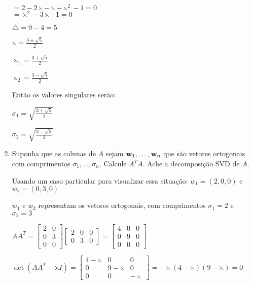 \documentclass[leqno]{article}
\numberwithin{equation}{section}
\begin{document}
\begin{enumerate}
\begin{sol}
		$= 2 - 2\leftthreetimes - \leftthreetimes + \leftthreetimes^2 - 1 = 0$\\
		$= \leftthreetimes^2 - 3\leftthreetimes + 1 = 0$
		
		$\bigtriangleup = 9 - 4 = 5$
		
		$\leftthreetimes = \frac{3 \pm \sqrt{5}}{2}$
		
		$\leftthreetimes_1 = \frac{3 + \sqrt{5}}{2}$
		
		$\leftthreetimes_2 = \frac{3 - \sqrt{5}}{2}$
		
		Então os valores singulares serão:
		
		$\sigma_1 = \sqrt{\frac{3 + \sqrt{5}}{2}}$
		
		$\sigma_2 = \sqrt{\frac{3 - \sqrt{5}}{2}}$
		\end{sol} 
		
		
		\item Suponha que as colunas de $A$ sejam $\mathbf{w}_1, \ldots, \mathbf{w}_n$ que são vetores ortogonais com comprimentos $\sigma_1, \ldots, \sigma_n$. Calcule $A^TA$. Ache a decomposição SVD de $A$.
		
		\begin{sol} 
			 Usando um caso particular para visualizar essa situação:
			 $w_1 = (2, 0, 0)$ e $w_2 = (0, 3, 0)$
			 
			 $w_1$ e $w_2$ representam os vetores ortogonais, com comprimentos $\sigma_1 = 2$ e $\sigma_2 = 3$
			 
			 $AA^T = \begin{bmatrix}
			 	2 & 0 \\
			 	0 & 3 \\
			 	0 & 0
			 \end{bmatrix}\begin{bmatrix}
				 2 & 0 & 0\\
				 0 & 3 & 0
			 \end{bmatrix} = \begin{bmatrix}
				 4 & 0 & 0\\
				 0 & 9 & 0\\
				 0 & 0 & 0
			 \end{bmatrix}$
		 
			 $\det(AA^T - \leftthreetimes I) = \begin{bmatrix}
			 	4 - \leftthreetimes & 0 & 0\\
			 	0 & 9 - \leftthreetimes& 0\\
			 	0 & 0 & - \leftthreetimes
			 \end{bmatrix} = -\leftthreetimes(4 - \leftthreetimes)(9 - \leftthreetimes) = 0$
		 

\end{sol}
\end{enumerate}
\end{document}

